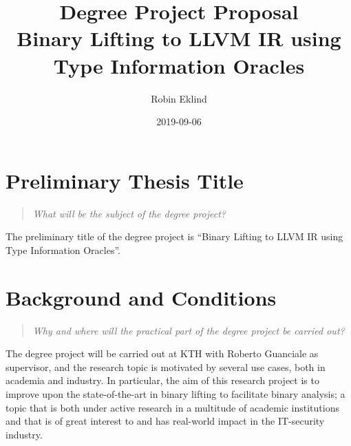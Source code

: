 \documentclass[12pt, a4paper]{article}
\title{Degree Project Proposal \\ \Large Binary Lifting to LLVM IR using Type Information Oracles}
\author{Robin Eklind \\ }
\date{2019-09-06}
\begin{document}



\maketitle

\clearpage


\tableofcontents

\clearpage



\section{Preliminary Thesis Title}

\begin{quote}
	\textit{What will be the subject of the degree project?}
\end{quote}


The preliminary title of the degree project is ``Binary Lifting to LLVM IR using Type Information Oracles''.

\section{Background and Conditions}

\begin{quote}
	\textit{Why and where will the practical part of the degree project be carried out?}
\end{quote}

The degree project will be carried out at KTH with Roberto Guanciale as supervisor, and the research topic is motivated by several use cases, both in academia and industry. In particular, the aim of this research project is to improve upon the state-of-the-art in binary lifting to facilitate binary analysis; a topic that is both under active research in a multitude of academic institutions and that is of great interest to and has real-world impact in the IT-security industry.
\end{document}
